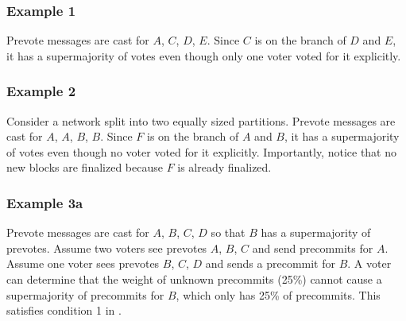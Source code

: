 \subsubsection*{Example 1}

Prevote messages are cast for $A$, $C$, $D$, $E$.
Since $C$ is on the branch of $D$ and $E$, it has a supermajority of votes even though only one voter voted for it explicitly.

\begin{figure}[H]
\end{figure}

\subsubsection*{Example 2}

Consider a network split into two equally sized partitions.
Prevote messages are cast for $A$, $A$, $B$, $B$.
Since $F$ is on the branch of $A$ and $B$, it has a supermajority of votes even though no voter voted for it explicitly.
Importantly, notice that no new blocks are finalized because $F$ is already finalized.

\begin{figure}[H]
\end{figure}

\subsubsection*{Example 3a}

Prevote messages are cast for $A$, $B$, $C$, $D$ so that $B$ has a supermajority of prevotes.
Assume two voters see prevotes $A$, $B$, $C$ and send precommits for $A$.
Assume one voter sees prevotes $B$, $C$, $D$ and sends a precommit for $B$.
A voter can determine that the weight of unknown precommits (25\%) cannot cause a supermajority of precommits for $B$, which only has 25\% of precommits.
This satisfies condition 1 in .

